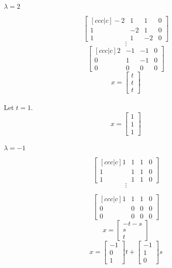 \documentclass{article}
\begin{document}
\paragraph{}$\lambda = 2$

\[
\begin{bmatrix}[ccc|c]
    -2 & 1 & 1 & 0\\
    1 & -2 & 1 & 0\\
    1 & 1 & -2 & 0
\end{bmatrix}
\]
\[
    \vdots
\]
\[
\begin{bmatrix}[ccc|c]
    2 & -1 & -1 & 0\\
    0 & 1 & -1 & 0\\
    0 & 0 & 0 & 0
\end{bmatrix}
\]
\[
    x = \begin{bmatrix}
        t\\t\\t
    \end{bmatrix}
\]
\paragraph{}Let $t = 1$.
\[
    x = \begin{bmatrix}
        1\\1\\1
    \end{bmatrix}
\]
\paragraph{}$\lambda = -1$

\[
\begin{bmatrix}[ccc|c]
    1 & 1 & 1 & 0\\
    1 & 1 & 1 & 0\\
    1 & 1 & 1 & 0
\end{bmatrix}
\]
\[
    \vdots
\]

\[
\begin{bmatrix}[ccc|c]
    1 & 1 & 1 & 0\\
    0 & 0 & 0 & 0\\
    0 & 0 & 0 & 0
\end{bmatrix}
\]
\[
    x = \begin{bmatrix}
        -t-s\\s\\t
    \end{bmatrix}
\]
\[
    x = \begin{bmatrix}
        -1 \\ 0 \\ 1
    \end{bmatrix}t
    + \begin{bmatrix}
        -1 \\ 1 \\ 0
    \end{bmatrix}s
\]
\end{document}
